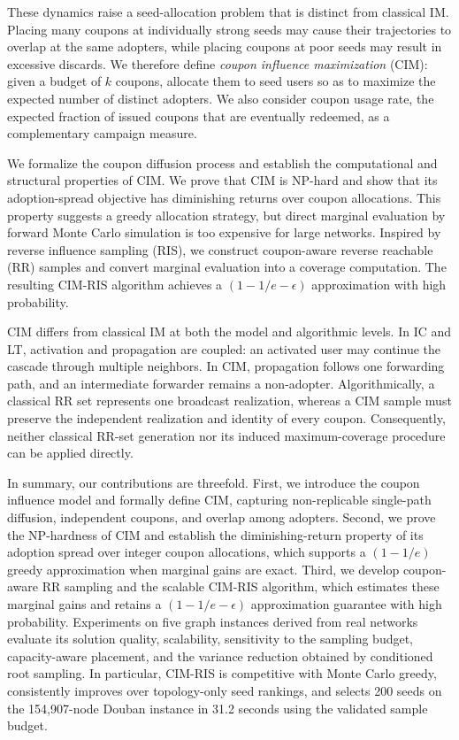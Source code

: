 \documentclass[sigconf,balance=false]{acmart}
\newcommand{\CIMRIS}{\textsc{CIM-RIS}}
\begin{document}
These dynamics raise a seed-allocation problem that is distinct from
classical IM.
Placing many coupons at individually strong seeds may cause their
trajectories to overlap at the same adopters, while placing coupons at
poor seeds may result in excessive discards.
We therefore define \emph{coupon influence maximization} (CIM): given a
budget of $k$ coupons, allocate them to seed users so as to maximize the
expected number of distinct adopters.
We also consider coupon usage rate, the expected fraction of issued
coupons that are eventually redeemed, as a complementary campaign
measure.

We formalize the coupon diffusion process and establish the computational
and structural properties of CIM.
We prove that CIM is NP-hard and show that its adoption-spread objective
has diminishing returns over coupon allocations.
This property suggests a greedy allocation strategy, but direct marginal
evaluation by forward Monte Carlo simulation is too expensive for large
networks.
Inspired by reverse influence sampling (RIS), we construct coupon-aware
reverse reachable (RR) samples and convert marginal evaluation into a
coverage computation.
The resulting \CIMRIS{} algorithm achieves a
$(1-1/e-\epsilon)$ approximation with high probability.

CIM differs from classical IM at both the model and algorithmic levels.
In IC and LT, activation and propagation are coupled: an activated user
may continue the cascade through multiple neighbors.
In CIM, propagation follows one forwarding path, and an intermediate
forwarder remains a non-adopter.
Algorithmically, a classical RR set represents one broadcast realization,
whereas a CIM sample must preserve the independent realization and
identity of every coupon.
Consequently, neither classical RR-set generation nor its induced
maximum-coverage procedure can be applied directly.

In summary, our contributions are threefold.
First, we introduce the coupon influence model and formally define CIM,
capturing non-replicable single-path diffusion, independent coupons, and
overlap among adopters.
Second, we prove the NP-hardness of CIM and establish the diminishing-return
property of its adoption spread over integer coupon allocations, which
supports a $(1-1/e)$ greedy approximation when marginal gains are exact.
Third, we develop coupon-aware RR sampling and the scalable \CIMRIS{}
algorithm, which estimates these marginal gains and retains a
$(1-1/e-\epsilon)$ approximation guarantee with high probability.
Experiments on five graph instances derived from real networks evaluate its
solution quality, scalability, sensitivity to the sampling budget,
capacity-aware placement, and the variance reduction obtained by conditioned
root sampling. In particular, \CIMRIS{} is competitive with Monte Carlo
greedy, consistently improves over topology-only seed rankings, and selects
200 seeds on the 154,907-node Douban instance in 31.2 seconds using the
validated sample budget.
\end{document}
